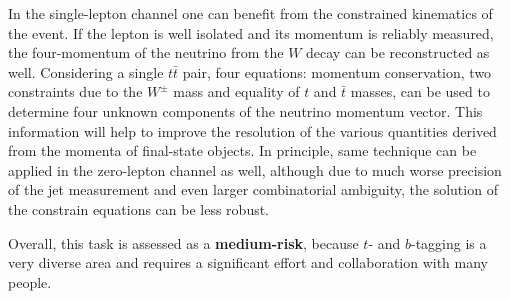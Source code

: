 In the single-lepton channel one can benefit from the constrained kinematics of the event. If the lepton is well isolated and its momentum is reliably measured, the four-momentum of the neutrino from the $W$ decay can be reconstructed as well. Considering a single $t\bar{t}$ pair, four equations: momentum conservation, two constraints due to the $W^\pm$ mass and equality of $t$ and $\bar{t}$ masses, can be used to determine four unknown components of the neutrino momentum vector. This information will help to improve the resolution of the various quantities derived from the momenta of final-state objects. In principle, same technique can be applied in the zero-lepton channel as well, although due to much worse precision of the jet measurement and even larger combinatorial ambiguity, the solution of the constrain equations can be less robust.

Overall, this task is assessed as a \textbf{medium-risk}, because $t$- and $b$-tagging is a very diverse area and requires a significant effort and collaboration with many people.
